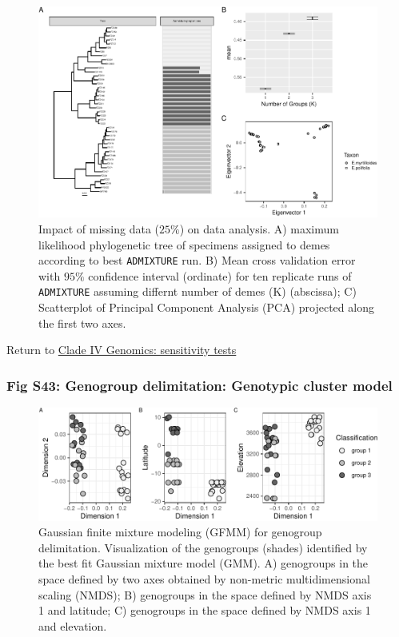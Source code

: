 \documentclass[
  11pt,
]{article}
\begin{document}
\begin{figure}
\includegraphics{Supplementary_Material_files/figure-latex/cladeIVgenomicSensitivityAnalysesSmallestplots-1} \caption{Impact of missing data ($25\%$) on data analysis. A) maximum likelihood phylogenetic tree of specimens assigned to demes according to best \texttt{ADMIXTURE} run. B) Mean cross validation error with $95\%$ confidence interval (ordinate) for ten replicate runs of \texttt{ADMIXTURE} assuming differnt number of demes (K) (abscissa); C) Scatterplot of Principal Component Analysis (PCA) projected along the first two axes.}\label{fig:cladeIVgenomicSensitivityAnalysesSmallestplots}
\end{figure}

Return to \protect\hyperlink{sensitivity-tests-3}{Clade IV Genomics: sensitivity tests}
\pagebreak

\hypertarget{fig-s43-genogroup-delimitation-genotypic-cluster-model}{%
\subsubsection{Fig S43: Genogroup delimitation: Genotypic cluster model}\label{fig-s43-genogroup-delimitation-genotypic-cluster-model}}

\begin{figure}
\includegraphics{Supplementary_Material_files/figure-latex/cladeIVmolecularDelimitationsNmms-1} \caption{Gaussian finite mixture modeling (GFMM) for genogroup delimitation. Visualization of the genogroups (shades) identified by the best fit Gaussian mixture model (GMM). A) genogroups in the space defined by two axes obtained by non-metric multidimensional scaling (NMDS); B) genogroups in the space defined by NMDS axis 1 and latitude; C) genogroups in the space defined by NMDS axis 1 and elevation.}\label{fig:cladeIVmolecularDelimitationsNmms}
\end{figure}
\end{document}
